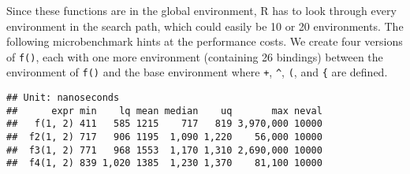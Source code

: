Since these functions are in the global environment, R has to look
through every environment in the search path, which could easily be 10
or 20 environments. The following microbenchmark hints at the
performance costs. We create four versions of \texttt{f()}, each with
one more environment (containing 26 bindings) between the environment of
\texttt{f()} and the base environment where \texttt{+}, \texttt{\^{}},
\texttt{(}, and \texttt{\{} are defined.

\begin{Shaded}
\begin{Highlighting}[]
\StringTok{ }\NormalTok{(} \NormalTok{()) \{}
\StringTok{ }\NormalTok{(}\NormalTok{(}\NormalTok{(}
   \NormalTok{(}
\NormalTok{\}}
\StringTok{ }
  \StringTok{ }
\NormalTok{\}}
\StringTok{ }\NormalTok{())}
\StringTok{ }\NormalTok{(}
\StringTok{ }\NormalTok{(}

\NormalTok{(}
  \NormalTok{(}\NormalTok{, }\NormalTok{),}
  \NormalTok{(}\NormalTok{, }\NormalTok{),}
  \NormalTok{(}\NormalTok{, }\NormalTok{),}
  \NormalTok{(}\NormalTok{, }\NormalTok{),}
   
\NormalTok{)}
\end{Highlighting}
\end{Shaded}

\begin{verbatim}
## Unit: nanoseconds
##      expr min    lq mean median    uq       max neval
##   f(1, 2) 411   585 1215    717   819 3,970,000 10000
##  f2(1, 2) 717   906 1195  1,090 1,220    56,000 10000
##  f3(1, 2) 771   968 1553  1,170 1,310 2,690,000 10000
##  f4(1, 2) 839 1,020 1385  1,230 1,370    81,100 10000
\end{verbatim}

